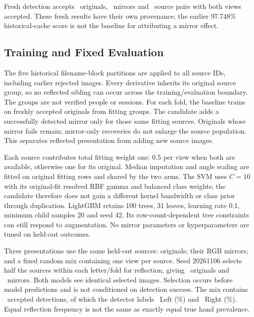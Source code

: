 Fresh detection accepts \MirrorOriginalAccepted\ originals, \MirrorFlippedAccepted\ mirrors and \MirrorPairedAccepted\ source pairs with both views accepted. These fresh results have their own provenance; the earlier 97.748\% historical-cache score is not the baseline for attributing a mirror effect.

\subsection{Training and Fixed Evaluation}
The five historical filename-block partitions are applied to all source IDs, including earlier rejected images. Every derivative inherits its original source group, so no reflected sibling can occur across the training/evaluation boundary. The groups are not verified people or sessions. For each fold, the baseline trains on freshly accepted originals from fitting groups. The candidate adds a successfully detected mirror only for those same fitting sources. Originals whose mirror fails remain; mirror-only recoveries do not enlarge the source population. This separates reflected presentation from adding new source images.

Each source contributes total fitting weight one: 0.5 per view when both are available, otherwise one for its original. Median imputation and angle scaling are fitted on original fitting rows and shared by the two arms. The SVM uses $C=10$ with its original-fit resolved RBF gamma and balanced class weights; the candidate therefore does not gain a different kernel bandwidth or class prior through duplication. LightGBM retains 100 trees, 31 leaves, learning rate 0.1, minimum child samples 20 and seed 42. Its row-count-dependent tree constraints can still respond to augmentation. No mirror parameters or hyperparameters are tuned on held-out outcomes.

Three presentations use the same held-out sources: originals; their RGB mirrors; and a fixed random mix containing one view per source. Seed 20261106 selects half the sources within each letter/fold for reflection, giving \MirrorMixOriginal\ originals and \MirrorMixFlipped\ mirrors. Both models see identical selected images. Selection occurs before model predictions and is not conditioned on detection success. The mix contains \MirrorMixedAccepted\ accepted detections, of which the detector labels \MirrorMixedLeft\ Left (\MirrorMixedLeftPercent\%) and \MirrorMixedRight\ Right (\MirrorMixedRightPercent\%). Equal reflection frequency is not the same as exactly equal true hand prevalence.

